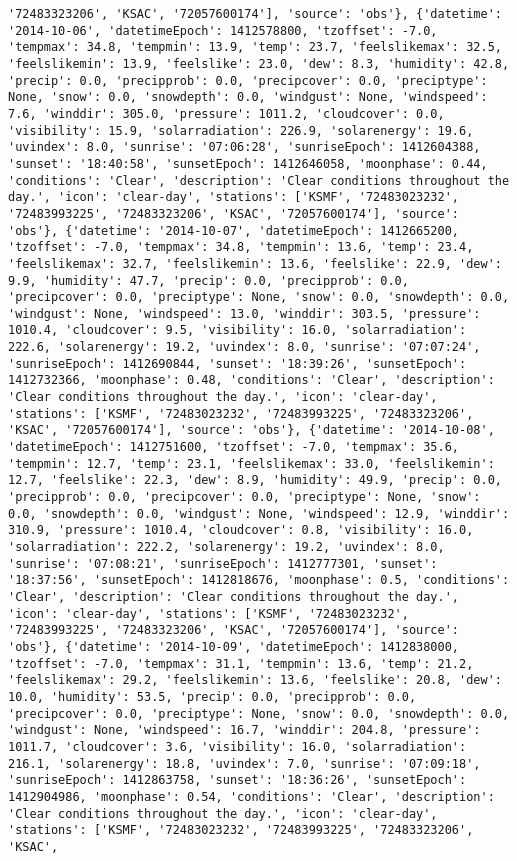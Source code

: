 \documentclass[
  letterpaper,
  DIV=11,
  numbers=noendperiod]{scrartcl}
\begin{document}
\begin{verbatim}
'72483323206', 'KSAC', '72057600174'], 'source': 'obs'}, {'datetime': '2014-10-06', 'datetimeEpoch': 1412578800, 'tzoffset': -7.0, 'tempmax': 34.8, 'tempmin': 13.9, 'temp': 23.7, 'feelslikemax': 32.5, 'feelslikemin': 13.9, 'feelslike': 23.0, 'dew': 8.3, 'humidity': 42.8, 'precip': 0.0, 'precipprob': 0.0, 'precipcover': 0.0, 'preciptype': None, 'snow': 0.0, 'snowdepth': 0.0, 'windgust': None, 'windspeed': 7.6, 'winddir': 305.0, 'pressure': 1011.2, 'cloudcover': 0.0, 'visibility': 15.9, 'solarradiation': 226.9, 'solarenergy': 19.6, 'uvindex': 8.0, 'sunrise': '07:06:28', 'sunriseEpoch': 1412604388, 'sunset': '18:40:58', 'sunsetEpoch': 1412646058, 'moonphase': 0.44, 'conditions': 'Clear', 'description': 'Clear conditions throughout the day.', 'icon': 'clear-day', 'stations': ['KSMF', '72483023232', '72483993225', '72483323206', 'KSAC', '72057600174'], 'source': 'obs'}, {'datetime': '2014-10-07', 'datetimeEpoch': 1412665200, 'tzoffset': -7.0, 'tempmax': 34.8, 'tempmin': 13.6, 'temp': 23.4, 'feelslikemax': 32.7, 'feelslikemin': 13.6, 'feelslike': 22.9, 'dew': 9.9, 'humidity': 47.7, 'precip': 0.0, 'precipprob': 0.0, 'precipcover': 0.0, 'preciptype': None, 'snow': 0.0, 'snowdepth': 0.0, 'windgust': None, 'windspeed': 13.0, 'winddir': 303.5, 'pressure': 1010.4, 'cloudcover': 9.5, 'visibility': 16.0, 'solarradiation': 222.6, 'solarenergy': 19.2, 'uvindex': 8.0, 'sunrise': '07:07:24', 'sunriseEpoch': 1412690844, 'sunset': '18:39:26', 'sunsetEpoch': 1412732366, 'moonphase': 0.48, 'conditions': 'Clear', 'description': 'Clear conditions throughout the day.', 'icon': 'clear-day', 'stations': ['KSMF', '72483023232', '72483993225', '72483323206', 'KSAC', '72057600174'], 'source': 'obs'}, {'datetime': '2014-10-08', 'datetimeEpoch': 1412751600, 'tzoffset': -7.0, 'tempmax': 35.6, 'tempmin': 12.7, 'temp': 23.1, 'feelslikemax': 33.0, 'feelslikemin': 12.7, 'feelslike': 22.3, 'dew': 8.9, 'humidity': 49.9, 'precip': 0.0, 'precipprob': 0.0, 'precipcover': 0.0, 'preciptype': None, 'snow': 0.0, 'snowdepth': 0.0, 'windgust': None, 'windspeed': 12.9, 'winddir': 310.9, 'pressure': 1010.4, 'cloudcover': 0.8, 'visibility': 16.0, 'solarradiation': 222.2, 'solarenergy': 19.2, 'uvindex': 8.0, 'sunrise': '07:08:21', 'sunriseEpoch': 1412777301, 'sunset': '18:37:56', 'sunsetEpoch': 1412818676, 'moonphase': 0.5, 'conditions': 'Clear', 'description': 'Clear conditions throughout the day.', 'icon': 'clear-day', 'stations': ['KSMF', '72483023232', '72483993225', '72483323206', 'KSAC', '72057600174'], 'source': 'obs'}, {'datetime': '2014-10-09', 'datetimeEpoch': 1412838000, 'tzoffset': -7.0, 'tempmax': 31.1, 'tempmin': 13.6, 'temp': 21.2, 'feelslikemax': 29.2, 'feelslikemin': 13.6, 'feelslike': 20.8, 'dew': 10.0, 'humidity': 53.5, 'precip': 0.0, 'precipprob': 0.0, 'precipcover': 0.0, 'preciptype': None, 'snow': 0.0, 'snowdepth': 0.0, 'windgust': None, 'windspeed': 16.7, 'winddir': 204.8, 'pressure': 1011.7, 'cloudcover': 3.6, 'visibility': 16.0, 'solarradiation': 216.1, 'solarenergy': 18.8, 'uvindex': 7.0, 'sunrise': '07:09:18', 'sunriseEpoch': 1412863758, 'sunset': '18:36:26', 'sunsetEpoch': 1412904986, 'moonphase': 0.54, 'conditions': 'Clear', 'description': 'Clear conditions throughout the day.', 'icon': 'clear-day', 'stations': ['KSMF', '72483023232', '72483993225', '72483323206', 'KSAC', 
\end{verbatim}
\end{document}
